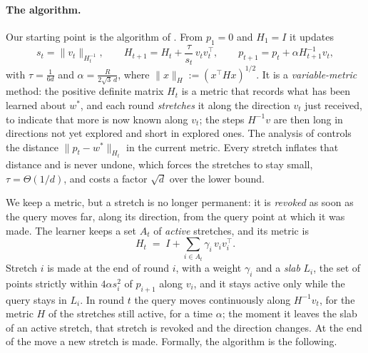 \documentclass[11pt]{article}
\theoremstyle{plain}
\theoremstyle{definition}
\theoremstyle{remark}
\newcommand{\wstar}{w^{\ast}}
\begin{document}
\paragraph{The algorithm.} Our starting point is the algorithm of \cite{Cai26}. From $p_1=0$ and
$H_1=I$ it updates
\begin{equation}\label{eq:vm}
  s_t=\|v_t\|_{H_t^{-1}},\qquad H_{t+1}=H_t+\frac{\tau}{s_t}\,v_tv_t^{\top},\qquad
  p_{t+1}=p_t+\alpha H_{t+1}^{-1}v_t ,
\end{equation}
with $\tau=\tfrac{1}{6d}$ and $\alpha=\tfrac{R}{2\sqrt3\,d}$, where $\|x\|_H:=(x^{\top}Hx)^{1/2}$.
It is a \emph{variable-metric} method: the positive definite matrix $H_t$ is a metric that records
what has been learned about $\wstar$, and each round \emph{stretches} it along the direction $v_t$
just received, to indicate that more is now known along $v_t$; the steps $H^{-1}v$ are then long in
directions not yet explored and short in explored ones. The analysis of \cite{Cai26} controls the
distance $\|p_t-\wstar\|_{H_t}$ in the current metric. Every stretch inflates that distance and is
never undone, which forces the stretches to stay small, $\tau=\Theta(1/d)$, and costs a factor
$\sqrt d$ over the lower bound.

We keep a metric, but a stretch is no longer permanent: it is \emph{revoked} as soon as the query
moves far, along its direction, from the query point at which it was made. The learner keeps a set
$A_t$ of \emph{active} stretches, and its metric is
\[
  H_t\;=\;I+\sum_{i\in A_t}\gamma_i\,v_iv_i^{\top} .
\]
Stretch $i$ is made at the end of round $i$, with a weight $\gamma_i$ and a \emph{slab} $L_i$, the
set of points strictly within $4\alpha s_i^{2}$ of $p_{i+1}$ along $v_i$, and it stays active only while the
query stays in $L_i$. In round $t$ the query moves continuously along $H^{-1}v_t$, for the metric
$H$ of the stretches still active, for a time $\alpha$; the moment it leaves the slab of an active
stretch, that stretch is revoked and the direction changes. At the end of the move a new stretch is
made. Formally, the algorithm is the following.
\end{document}
